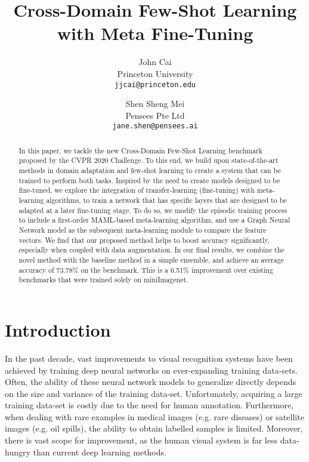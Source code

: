 \documentclass[10pt,twocolumn,letterpaper]{article}
\begin{document}
\title{Cross-Domain Few-Shot Learning with Meta Fine-Tuning}

\author{John Cai \\
Princeton University \\
  {\tt jjcai@princeton.edu} 
\and 
Shen Sheng Mei \\
Pensees Pte Ltd \\
  {\tt jane.shen@pensees.ai}
}

\maketitle


\begin{abstract}
   In this paper, we tackle the new Cross-Domain Few-Shot Learning benchmark proposed by the CVPR 2020 Challenge. To this end, we build upon state-of-the-art methods in domain adaptation and few-shot learning to create a system that can be trained to perform both tasks. Inspired by the need to create models designed to be fine-tuned, we explore the integration of transfer-learning (fine-tuning) with meta-learning algorithms, to train a network that has specific layers that are designed to be adapted at a later fine-tuning stage. To do so, we modify the episodic training process to include a first-order MAML-based meta-learning algorithm, and use a Graph Neural Network model as the subsequent meta-learning module to compare the feature vectors. We find that our proposed method helps to boost accuracy significantly, especially when coupled with data augmentation. In our final results, we combine the novel method with the baseline method in a simple ensemble, and achieve an average accuracy of 73.78\% on the benchmark. This is a 6.51\% improvement over existing benchmarks that were trained solely on miniImagenet.
\end{abstract}

\section{Introduction}

In the past decade, vast improvements to visual recognition systems have been achieved by training deep neural networks on ever-expanding training data-sets. Often, the ability of these neural network models to generalize directly depends on the size and variance of the training data-set. Unfortunately, acquiring a large training data-set is costly due to the need for human annotation. Furthermore, when dealing with rare examples in medical images (e.g. rare diseases) or satellite images (e.g. oil spills), the ability to obtain labelled samples is limited. Moreover, there is vast scope for improvement, as the human visual system is far less data-hungry than current deep learning methods.
\end{document}
